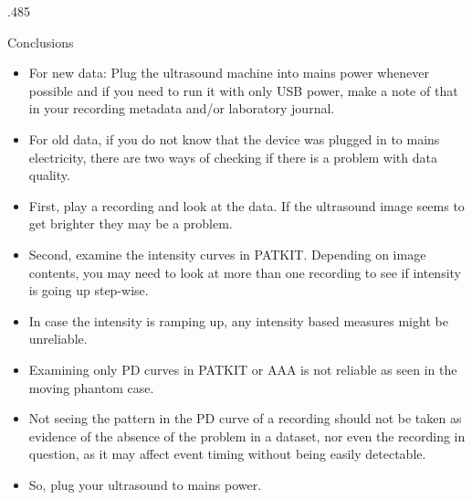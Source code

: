 \documentclass[final,hyperref={pdfpagelabels=false}]{beamer}
\begin{document}
\begin{frame}{}
\begin{columns}[t]
\begin{column}{.485\linewidth}
\begin{block}{Conclusions}
        \begin{itemize}
        \item For new data: Plug the ultrasound machine into mains power
          whenever possible and if you need to run it with only USB power, make
          a note of that in your recording metadata and/or laboratory journal. 
        \item For old data, if you do not know that the device was plugged in
          to mains electricity, there are two ways of checking if there is a
          problem with data quality. 
        \item First, play a recording and look at the
          data. If the ultrasound image seems to get brighter they may be a
          problem. 
        \item Second, examine the intensity curves in PATKIT. Depending on image contents, you may need
          to look at more than one recording to see if intensity is going up
          step-wise. 
        \item In case the intensity is ramping up, any intensity based measures
          might be unreliable. 
        \item Examining only PD curves in PATKIT or AAA
          \citep{ArticulateInstruments-ArticulateAssistantAdvanced-2012-actual}
          is not reliable as seen in the moving phantom case. 
        \item Not seeing the pattern in the PD curve of a recording should not
          be taken as evidence of the absence of the problem in a dataset, nor
          even the recording in question, as it may affect event timing without
          being easily detectable. 
        \item So, plug your ultrasound to mains power.
        \end{itemize}
      \end{block}



    \end{column}
  \end{columns}

  
\end{frame}
\end{document}
